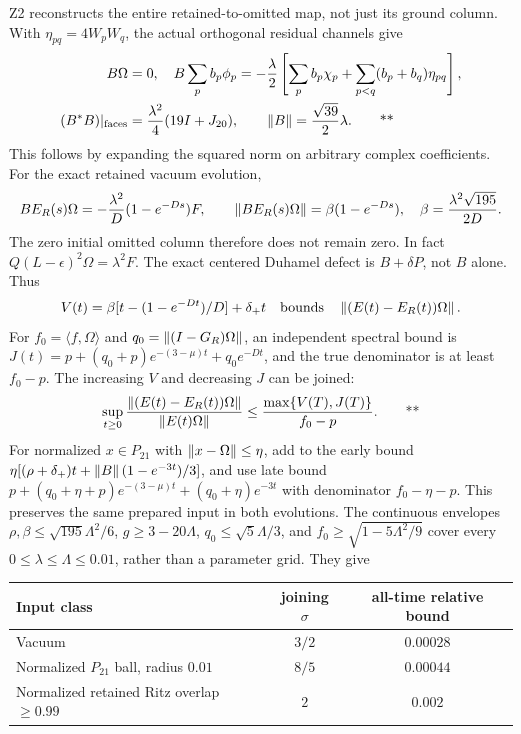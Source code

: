Z2 reconstructs the entire retained-to-omitted map, not just its ground column.
With $\eta_{pq}=4W_pW_q$, the actual orthogonal residual channels give
\begin{align}
 B\Omega&=0,\quad
 B\sum_pb_p\phi_p=-\frac\lambda2\left[
 \sum_pb_p\chi_p+\sum_{p<q}(b_p+b_q)\eta_{pq}\right],\notag\\
 (B^*B)|_{\mathrm{faces}}&=\frac{\lambda^2}{4}(19I+J_{20}),
 \qquad\left\lVert B\right\rVert=\frac{\sqrt{39}}2\lambda.\qquad\text{**}
 \label{recent:omitted-gram21}
\end{align}
This follows by expanding the squared norm on arbitrary complex coefficients.
For the exact retained vacuum evolution,
\begin{equation}
 BE_R(s)\Omega=-\frac{\lambda^2}{D}(1-e^{-Ds})F,
 \qquad\left\lVert BE_R(s)\Omega\right\rVert=\beta(1-e^{-Ds}),\quad
 \beta=\frac{\lambda^2\sqrt{195}}{2D}.
 \label{recent:vacuum-loading21}
\end{equation}
The zero initial omitted column therefore does not remain zero.  In fact
$Q(L-\epsilon)^2\Omega=\lambda^2F$.
The exact centered Duhamel defect is $B+\delta P$, not $B$ alone.  Thus
\begin{equation}
 V(t)=\beta[t-(1-e^{-Dt})/D]+\delta_+t
 \quad\text{bounds}\quad\left\lVert (E(t)-E_R(t))\Omega\right\rVert.
 \label{recent:early21}
\end{equation}
For $f_0=\langle f,\Omega\rangle$ and
$q_0=\left\lVert (I-G_R)\Omega\right\rVert$, an independent spectral bound is
$J(t)=p+(q_0+p)e^{-(3-\mu)t}+q_0e^{-Dt}$, and the true denominator is at least
$f_0-p$.  The increasing $V$ and decreasing $J$ can be joined:
\begin{equation}
 \sup_{t\ge0}\frac{\left\lVert (E(t)-E_R(t))\Omega\right\rVert}{\left\lVert E(t)\Omega\right\rVert}
 \le\frac{\max\{V(T),J(T)\}}{f_0-p}.\qquad\text{**}
 \label{recent:join21}
\end{equation}
For normalized $x\in P_{21}$ with $\left\lVert x-\Omega\right\rVert\le\eta$, add to the early
bound $\eta[(\rho+\delta_+)t+\left\lVert B\right\rVert(1-e^{-3t})/3]$, and use late bound
$p+(q_0+\eta+p)e^{-(3-\mu)t}+(q_0+\eta)e^{-3t}$ with denominator
$f_0-\eta-p$.  This preserves the same prepared input in both evolutions.
The continuous envelopes
$\rho,\beta\le\sqrt{195}\Lambda^2/6$, $g\ge3-20\Lambda$,
$q_0\le\sqrt5\Lambda/3$, and $f_0\ge\sqrt{1-5\Lambda^2/9}$ cover every
$0\le\lambda\le\Lambda\le0.01$, rather than a parameter grid.  They give
\begin{center}
\begin{tabular}{lcc}
Input class & joining $\sigma$ & all-time relative bound\\\hline
Vacuum & $3/2$ & $0.00028$\\
Normalized $P_{21}$ ball, radius $0.01$ & $8/5$ & $0.00044$\\
Normalized retained Ritz overlap $\ge0.99$ & $2$ & $0.002$
\end{tabular}
\end{center}
